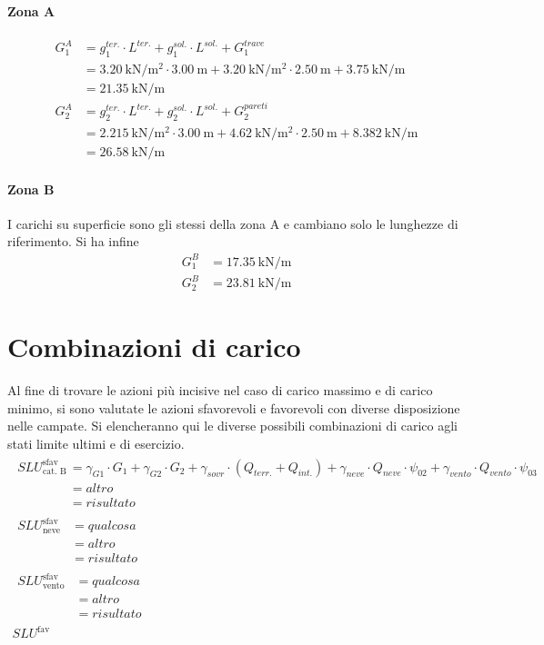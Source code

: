 \paragraph*{Zona A} 
\[
\begin{split}
G_1^A &=  g_1^{ter.}\cdot L^{ter.} + g_1^{sol.}\cdot L^{sol.} + G_1^{trave} \\
&= \SI{3.20}{\kilo\newton\per\square\meter}\cdot\SI{3.00}{\meter} + \SI{3.20}{\kilo\newton\per\square\meter}\cdot\SI{2.50}{\meter} + \SI{3.75}{\kilo\newton\per\meter} \\
&= \SI{21.35}{\kilo\newton\per\meter} \\
G_2^A &= g_2^{ter.}\cdot L^{ter.} + g_2^{sol.}\cdot L^{sol.} + G_2^{pareti} \\
&= \SI{2.215}{\kilo\newton\per\square\meter}\cdot\SI{3.00}{\meter} + \SI{4.62}{\kilo\newton\per\square\meter}\cdot\SI{2.50}{\meter} + \SI{8.382}{\kilo\newton\per\meter} \\
&= \SI{26.58}{\kilo\newton\per\meter}
\end{split}
\]
\paragraph*{Zona B} I carichi su superficie sono gli stessi della zona A e cambiano solo le lunghezze di riferimento. 
Si ha infine
\begin{align*}
G_1^B &= \SI{17.35}{\kilo\newton\per\meter}\\
G_2^B &= \SI{23.81}{\kilo\newton\per\meter}
\end{align*}
\section{Combinazioni di carico}
Al fine di trovare le azioni più incisive nel caso di carico massimo e di carico minimo, si sono valutate le azioni sfavorevoli e favorevoli con diverse disposizione nelle campate. 
Si elencheranno qui le diverse possibili combinazioni di carico agli stati limite ultimi e di esercizio.
\begin{align}
	\begin{split}
	SLU^{\text{sfav}}_{\text{cat. B}} &= \gamma_{G1}\cdot G_1 + \gamma_{G2} \cdot G_2 + \gamma_{sovr} \cdot (Q_{terr.} + Q_{int.}) + \gamma_{neve}\cdot Q_{neve}\cdot\psi_{02} + \gamma_{vento}\cdot Q_{vento} \cdot \psi_{03}  \\
											&= altro \\
											&= risultato
	\end{split} \\
	\begin{split}
	SLU^{\text{sfav}}_{\text{neve}} &= qualcosa \\
									&= altro \\
									&= risultato
	\end{split} \\
	\begin{split}
	SLU^{\text{sfav}}_{\text{vento}}&= qualcosa \\
									&= altro \\
									&= risultato
	\end{split} \\
	SLU^{\text{fav}}	
\end{align}


